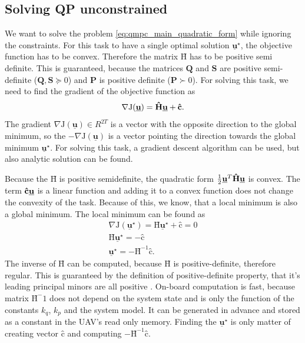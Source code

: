 \documentclass[a4paper,11pt,titlepage]{article}
\newcommand{\uvec}{\textbf{\underline{u}}}
\newcommand{\macJ}{\mathrm{J}(\uvec)}
\begin{document}
\subsection{Solving QP unconstrained}
We want to solve the problem \ref{eq:qmpc_main_quadratic_form} while ignoring the constraints. For this task to have a single optimal solution $\underline{\textbf{u}}^{\star}$, the objective function has to be convex. Therefore the matrix $\textbf{\^H}$ has to be positive semi definite. This is guaranteed, because the matrices  $\textbf{Q}$ and $\textbf{S}$ are positive semi-definite ($\textbf{Q}, \textbf{S} \succeq 0$) and $\textbf{P}$ is positive definite ($\textbf{P} \succ 0$). For solving this task, we need to find the gradient of the objective function \cite{zometa2012implementation} as
\begin{equation}
\label{eq:J_grad}
\nabla\macJ = \textbf{\^H}\uvec + \textbf{\^c}.
\end{equation}
The gradient $\nabla\mathrm{J}(\underline{\textbf{u}}) \in R^{2T}$ is a vector with the opposite direction to the global minimum, so the $-\nabla\mathrm{J}(\underline{\textbf{u}})$ is a vector pointing the direction towards the global minimum $\underline{\textbf{u}}^{\star}$. For solving this task, a gradient descent algorithm can be used, but also analytic solution can be found.  

Because the  $\textbf{\^H}$ is positive semidefinite, the quadratic form $\frac{1}{2}\uvec^T\textbf{\^H}\uvec$ is convex. The term $\textbf{\^c} \uvec$ is a linear function and adding it to a convex function does not change the convexity of the task. Because of this, we know, that a local minimum is also a global minimum. The local minimum can be found as 
\begin{equation}
\label{eq:J_local_min}
\begin{split}
\nabla\mathrm{J}(\underline{\textbf{u}}^{\star}) = \textbf{\^H}\underline{\textbf{u}}^{\star} + \textbf{\^c} = 0 \\
\textbf{\^H}\underline{\textbf{u}}^{\star} = - \textbf{\^c} \\
\underline{\textbf{u}}^{\star} = -\textbf{\^H}^{-1}\textbf{\^c}.
\end{split}
\end{equation}
The inverse of $\textbf{\^H}$ can be computed, because $\textbf{\^H}$ is positive-definite, therefore regular. This is guaranteed by the definition of positive-definite property, that it's leading principal minors are all positive \cite{chong2013introduction}. On-board computation is fast, because matrix $\textbf{\^H}^-1$ does not depend on the system state and is only the function of the constants $k_q$, $k_p$ and the system model. It can be generated in advance and stored as a constant in the UAV's read only memory. Finding the $\underline{\textbf{u}}^{\star}$ is only matter of creating vector $\textbf{\^c}$ and computing $-\textbf{\^H}^{-1}\textbf{\^c}$.
\end{document}
